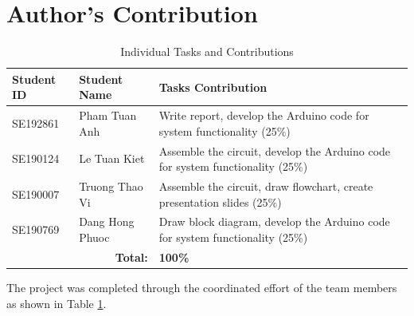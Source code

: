 \documentclass[a4paper, 10pt]{article}
\begin{document}
	\section{Author's Contribution}
	\begin{table}[htbp]
		\centering
		\caption{Individual Tasks and Contributions}
		\begin{tabularx}{\textwidth}{@{}llX@{}}
			\toprule
			\textbf{Student ID} & \textbf{Student Name} & \textbf{Tasks Contribution} \\
			\midrule
			SE192861 & Pham Tuan Anh & Write report, develop the Arduino code for system functionality (25\%) \\
			SE190124 & Le Tuan Kiet & Assemble the circuit, develop the Arduino code for system functionality (25\%) \\	
			SE190007 & Truong Thao Vi & Assemble the circuit, draw flowchart, create presentation slides (25\%) \\
			SE190769 & Dang Hong Phuoc & Draw block diagram, develop the Arduino code for system functionality (25\%) \\
			\bottomrule
			\multicolumn{2}{r}{\textbf{Total:}} & \textbf{100\%} \\
		\end{tabularx}
		\label{tab:contribution}
	\end{table}
	The project was completed through the coordinated effort of the team members as shown in Table \ref{tab:contribution}.
	
	\newpage
	\printbibliography[heading=bibintoc, title={References}]
	
\end{document}
